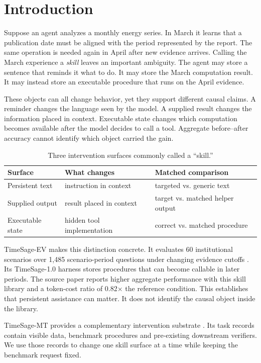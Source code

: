 \section{Introduction}
Suppose an agent analyzes a monthly energy series. In March it learns that a publication date must be aligned with the period represented by the report. The same operation is needed again in April after new evidence arrives. Calling the March experience a \emph{skill} leaves an important ambiguity. The agent may store a sentence that reminds it what to do. It may store the March computation result. It may instead store an executable procedure that runs on the April evidence.

These objects can all change behavior, yet they support different causal claims. A reminder changes the language seen by the model. A supplied result changes the information placed in context. Executable state changes which computation becomes available after the model decides to call a tool. Aggregate before--after accuracy cannot identify which object carried the gain.

\begin{table}[t]
\centering
\small
\setlength{\tabcolsep}{5pt}
\caption{Three intervention surfaces commonly called a ``skill.''}
\label{tab:surfaces}
\begin{tabular}{lll}
\toprule
Surface & What changes & Matched comparison \\
\midrule
Persistent text & instruction in context & targeted vs. generic text \\
Supplied output & result placed in context & target vs. matched helper output \\
Executable state & hidden tool implementation & correct vs. matched procedure \\
\bottomrule
\end{tabular}
\end{table}

TimeSage-EV makes this distinction concrete. It evaluates 60 institutional scenarios over 1,485 scenario-period questions under changing evidence cutoffs \citep{yao2026timesage}. Its TimeSage-1.0 harness stores procedures that can become callable in later periods. The source paper reports higher aggregate performance with this skill library and a token-cost ratio of 0.82$\times$ the reference condition. This establishes that persistent assistance can matter. It does not identify the causal object inside the library.

TimeSage-MT provides a complementary intervention substrate \citep{kong2026timesagemt}. Its task records contain visible data, benchmark procedures and pre-existing downstream verifiers. We use those records to change one skill surface at a time while keeping the benchmark request fixed.

